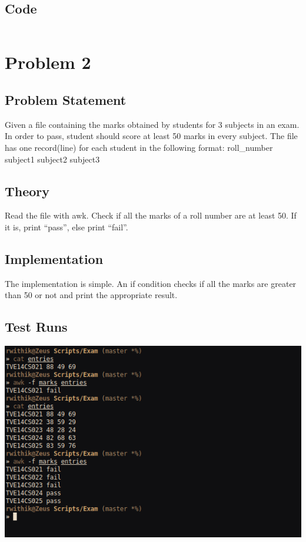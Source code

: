 \documentclass[10pt,a4paper,titlepage]{report}
\begin{document}
\section*{Code}

\inputminted[tabsize=4]{bash}{../Scripts/Exam/binary.sh}

\chapter*{Problem 2}

\section*{Problem Statement}

Given a file containing the marks obtained by students for 3 subjects in an
exam. In order to pass, student should score at least 50 marks in every
subject. The file has one record(line) for each student in the following
format:\newline
roll\_number subject1 subject2 subject3

\section*{Theory}

Read the file with awk. Check if all the marks of a roll number are at least 50. If it is, print ``pass'', else print ``fail''.

\section*{Implementation}

The implementation is simple. An if condition checks if all the marks are greater than 50 or not and print the appropriate result. 

\section*{Test Runs}

\includegraphics[width=\linewidth]{../Images/ExamReport/marks.png}
\end{document}
